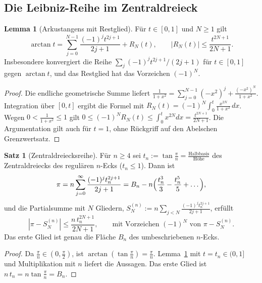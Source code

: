 \documentclass[a4paper,12pt,twoside]{report}
\theoremstyle{definition}
\newtheorem{satz}{Satz}
\newtheorem{lemma}{Lemma}
\begin{document}
\subsection{Die Leibniz-Reihe im Zentraldreieck}
\label{sec:ok:leibniz}

\begin{lemma}[Arkustangens mit Restglied]\label{ok:lem:arctan}
Für $t\in[0,1]$ und $N\ge1$ gilt
\[
\arctan t=\sum_{j=0}^{N-1}\frac{(-1)^jt^{2j+1}}{2j+1}+R_N(t),\qquad
|R_N(t)|\le\frac{t^{2N+1}}{2N+1}.
\]
Insbesondere konvergiert die Reihe $\sum_j(-1)^jt^{2j+1}/(2j+1)$ für $t\in[0,1]$ gegen $\arctan t$, und das Restglied hat das Vorzeichen $(-1)^N$.
\end{lemma}

\begin{proof}
Die endliche geometrische Summe liefert $\frac1{1+x^2}=\sum_{j=0}^{N-1}(-x^2)^j+\frac{(-x^2)^N}{1+x^2}$. Integration über $[0,t]$ ergibt die Formel mit $R_N(t)=(-1)^N\int_0^t\frac{x^{2N}}{1+x^2}\,dx$. Wegen $0<\frac1{1+x^2}\le1$ gilt $0\le(-1)^NR_N(t)\le\int_0^tx^{2N}dx=\frac{t^{2N+1}}{2N+1}$. Die Argumentation gilt auch für $t=1$, ohne Rückgriff auf den Abelschen Grenzwertsatz.
\end{proof}

\begin{satz}[Zentraldreiecksreihe]\label{ok:satz:zdr}
Für $n\ge4$ sei $t_n:=\tan\frac\pi n=\frac{\text{Halbbasis}}{\text{Höhe}}$ des Zentraldreiecks des regulären $n$-Ecks ($t_n\le1$). Dann ist
\[
\pi=n\sum_{j=0}^\infty\frac{(-1)^jt_n^{2j+1}}{2j+1}=B_n-n\Bigl(\frac{t_n^3}3-\frac{t_n^5}5+\dots\Bigr),
\]
und die Partialsumme mit $N$ Gliedern, $S_N^{(n)}:=n\sum_{j<N}\frac{(-1)^jt_n^{2j+1}}{2j+1}$, erfüllt
\[
|\pi-S_N^{(n)}|\le\frac{n\,t_n^{2N+1}}{2N+1},\qquad\text{mit Vorzeichen }(-1)^N\text{ von }\pi-S_N^{(n)} .
\]
Das erste Glied ist genau die Fläche $B_n$ des umbeschriebenen $n$-Ecks.
\end{satz}

\begin{proof}
Da $\frac\pi n\in(0,\frac\pi2)$, ist $\arctan(\tan\frac\pi n)=\frac\pi n$. Lemma~\ref{ok:lem:arctan} mit $t=t_n\in(0,1]$ und Multiplikation mit $n$ liefert die Aussagen. Das erste Glied ist $n\,t_n=n\tan\frac\pi n=B_n$.
\end{proof}
\end{document}
